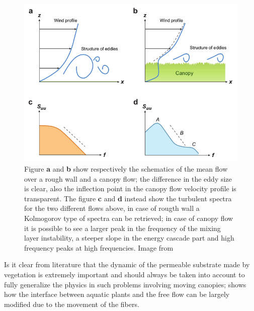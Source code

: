 \begin{figure}[h]
	\centering
	\includegraphics[width=0.7\linewidth]{chapter_1/spectra}
	\caption{Figure \textbf{a} and \textbf{b} show respectively the schematics of the mean flow over a rough wall and a canopy flow; the difference in the eddy size is clear, also the inflection point in the canopy flow velocity profile is transparent.
		The figure \textbf{c} and \textbf{d} instead show the turbulent spectra for the two different flows above, in case of rougth wall a Kolmogorov type of spectra can be retrieved; in case of canopy flow it is possible to see  a larger peak in the frequency of the mixing layer instability, a steeper slope in the energy cascade part and high frequency peaks at high frequencies. Image from \citet{de2008effects}}
		\label{fig:spectra}
	\end{figure}

Is it clear from literature that the dynamic of the permeable substrate made by vegetation is extremely important and should always be taken into account to fully generalize the physics in such problems involving moving canopies; \citet{nepf2012flow} shows how the interface between aquatic plants and the free flow can be largely modified due to the movement of the fibers.

